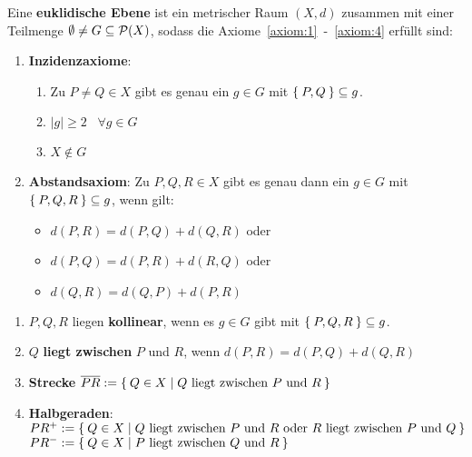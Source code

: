 \begin{definition}%
    Eine \textbf{euklidische Ebene} ist ein metrischer Raum $(X,d)$ 
    zusammen mit einer Teilmenge $\emptyset \neq G \subseteq \mathcal{P}(X)$, sodass die
    Axiome~\ref{axiom:1}~-~\ref{axiom:4} erfüllt sind:
    \begin{enumerate}[label=§\arabic*),ref=§\arabic*]
        \item \textbf{Inzidenzaxiome}:\label{axiom:1}
            \begin{enumerate}[label=(\roman*),ref=\theenumi{} (\roman*)]
                \item Zu $P \neq Q \in X$ gibt es genau ein $g \in G$ mit
                      $\Set{P, Q} \subseteq g$.
                \item $|g| \geq 2 \;\;\; \forall g \in G$
                \item $X \notin G$
            \end{enumerate}
        \item \textbf{Abstandsaxiom}: Zu $P, Q, R \in X$ gibt es \label{axiom:2}
              genau dann ein $g \in G$ mit $\Set{P, Q, R} \subseteq g$,
              wenn gilt: 
              \begin{itemize}[]
                \item $d(P, R) = d(P, Q) + d(Q, R)$ oder
                \item $d(P, Q) = d(P, R) + d(R, Q)$ oder
                \item $d(Q, R) = d(Q, P) + d(P, R)$
              \end{itemize}
    \end{enumerate}
\end{definition}

\begin{definition}
    \begin{enumerate}[label=\alph*)]
        \item $P, Q, R$ liegen \textbf{kollinear}, 
              wenn es $g \in G$ gibt mit $\Set{P, Q, R} \subseteq g$.
        \item $Q$ \textbf{liegt zwischen} $P$
              und $R$, wenn $d(P, R) = d(P, Q) + d(Q, R)$
        \item \textbf{Strecke} $\overline{PR} := \Set{Q \in X | Q \text{ liegt zwischen } P \text{ und } R}$
        \item \textbf{Halbgeraden}:\\
              $PR^+ := \Set{Q \in X | Q \text{ liegt zwischen } P \text{ und } R \text{ oder } R \text{ liegt zwischen } P \text{ und } Q}$\\
              $PR^- := \Set{Q \in X | P \text{ liegt zwischen } Q \text{ und } R}$\\ 
    \end{enumerate}
\end{definition}

